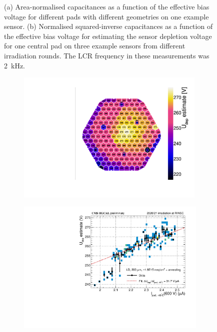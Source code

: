 \begin{figure}
\begin{subfigure}[b]{0.49\textwidth}
		\subcaption{
		}
		\label{plot:pad_invCV_sensor}
	\end{subfigure}
	\caption{
		(a) Area-normalised capacitances as a function of the effective bias voltage for different pads with different geometries on one example sensor.
		(b) Normalised squared-inverse capacitances as a function of the effective bias voltage for estimating the sensor depletion voltage for one central pad on three example sensors from different irradiation rounds.
		The LCR frequency in these measurements was \SI{2}{\kilo\hertz}.
	}
\end{figure}



\begin{figure}
	\captionsetup[subfigure]{aboveskip=-1pt,belowskip=-1pt}
	\centering
	\begin{subfigure}[b]{0.49\textwidth}
		\centering
		\includegraphics[width=0.99\textwidth]{plots/Vdep_hexplots/0541_04.pdf}
		\subcaption{
			}
			\label{plot:Vdep_hexplot_0541_04}
	\end{subfigure}
	\hfill
	\begin{subfigure}[b]{0.49\textwidth}
		\centering
		\includegraphics[width=0.999\textwidth]{plots/Vdep_vs_fluence/Vdep_vs_current_5414.pdf}

\end{subfigure}
\end{figure}
